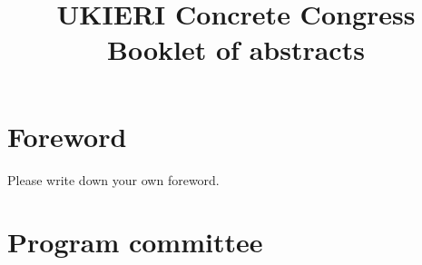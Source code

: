 \documentclass{book}
\begin{document}
\title{ \textbf{UKIERI Concrete Congress 
\linebreak
\vspace*{1cm}
 Booklet of abstracts}}
\author{}
\date{\empty}

\maketitle

\tableofcontents

\chapter*{Foreword}

Please write down your own foreword.

\chapter*{Program committee}
\begin{multicols}{2}

\end{multicols}
% 
% 




\printindex[authors]
\end{document}
